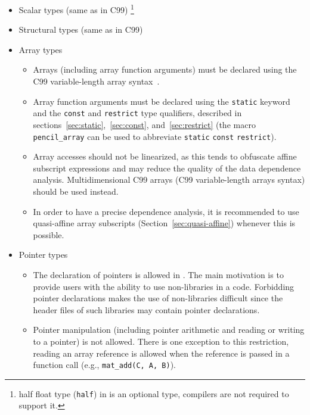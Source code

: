  \begin{itemize}
  \item Scalar types (same as in C99)
      \footnote{half float type (\lstinline!half!) in \pencil is an optional
      type, \pencil compilers are not required to support it.}
  \item Structural types (same as in C99)
  \item Array types
  \begin{itemize}
    \item Arrays (including array function arguments) must be declared using the C99
      variable-length array syntax~\cite{c99}.
    \item Array function arguments
      must be declared using the \lstinline!static! keyword and
      the \lstinline!const! and \lstinline!restrict! type qualifiers,
      described in sections~\ref{sec:static},~\ref{sec:const},
      and~\ref{sec:restrict}
      (the macro \lstinline!pencil_array! can be used to
      abbreviate \lstinline!static! \lstinline!const! \lstinline!restrict!).
    \item Array accesses should not be linearized, as this tends to
      obfuscate affine subscript expressions and may reduce the quality of
      the data dependence analysis.
      Multidimensional C99 arrays (C99 variable-length arrays syntax)
      should be used instead.
    \item In order to have a precise dependence analysis, it is recommended
      to use quasi-affine array subscripts (Section~\ref{sec:quasi-affine})
      whenever this is possible.
  \end{itemize}
  \item Pointer types
  \begin{itemize}
    \item The declaration of pointers is allowed in \pencil.
      The main motivation is to provide \pencil users with the ability
      to use non-\pencil libraries in a \pencil code.
      Forbidding pointer declarations makes the use of non-\pencil libraries
      difficult since the header files of such libraries may contain pointer
      declarations.

    \item Pointer manipulation (including pointer arithmetic and reading or
      writing to a pointer) is not allowed.  There is one exception to this
      restriction, reading an array reference is allowed when the reference is
      passed in a function call (e.g., \lstinline!mat_add(C, A, B)!).
      

\end{itemize}
\end{itemize}
